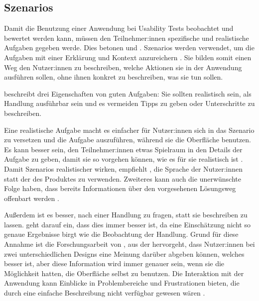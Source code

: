\subsection{Szenarios}
\label{sec:scenarios}

Damit die Benutzung einer Anwendung bei Usability Tests beobachtet und bewertet werden kann, müssen den Teilnehmer:innen spezifische und realistische Aufgaben gegeben werde. Dies betonen \textcite{mccloskeyTaskScenarios2014} und \textcite{barnumUsabilityTesting2021}. Szenarios werden verwendet, um die Aufgaben mit einer Erklärung und Kontext anzureichern \parencite{mccloskeyTaskScenarios2014}. Sie bilden somit einen Weg den Nutzer:innen zu beschreiben, welche Aktionen sie in der Anwendung ausführen sollen, ohne ihnen konkret zu beschreiben, was sie tun sollen.

\textcite{mccloskeyTaskScenarios2014} beschreibt drei Eigenschaften von guten Aufgaben: Sie sollten realistisch sein, als Handlung ausführbar sein und es vermeiden Tipps zu geben oder Unterschritte zu beschreiben.

Eine realistische Aufgabe macht es einfacher für Nutzer:innen sich in das Szenario zu versetzen und die Aufgabe auszuführen, während sie die Oberfläche benutzen. Es kann besser sein, den Teilnehmer:innen etwas Spielraum in den Details der Aufgabe zu geben, damit sie so vorgehen können, wie es für sie realistisch ist \parencite{mccloskeyTaskScenarios2014}. Damit Szenarios realistischer wirken, empfiehlt \textcite{barnumUsabilityTesting2021}, die Sprache der Nutzer:innen statt der des Produktes zu verwenden. Zweiteres kann auch die unerwünschte Folge haben, dass bereits Informationen über den vorgesehenen Lösungsweg offenbart werden \parencite{barnumUsabilityTesting2021}.

Außerdem ist es besser, nach einer Handlung zu fragen, statt sie beschreiben zu lassen. \textcite{nielsenFirstRule2001} geht darauf ein, dass dies immer besser ist, da eine Einschätzung nicht so genaue Ergebnisse birgt wie die Beobachtung der Handlung. Grund für diese Annahme ist die Forschungsarbeit von \textcite{nielsenMeasuringUsability1994}, aus der hervorgeht, dass Nutzer:innen bei zwei unterschiedlichen Designs eine Meinung darüber abgeben können, welches besser ist, aber diese Information wird immer genauer sein, wenn sie die Möglichkeit hatten, die Oberfläche selbst zu benutzen. Die Interaktion mit der Anwendung kann Einblicke in Problembereiche und Frustrationen bieten, die durch eine einfache Beschreibung nicht verfügbar gewesen wären \parencite{mccloskeyTaskScenarios2014}.

